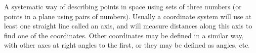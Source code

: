 A systematic way of describing points in space using sets of three numbers (or points 
in a plane using pairs of numbers). Usually a coordinate system will use at least 
one straight line called an axis, and will measure distances along this axis to find
one of the coordinates. Other coordinates may be defined in a similar way, with
 other axes at right angles to the first, or they may be defined as angles, etc.